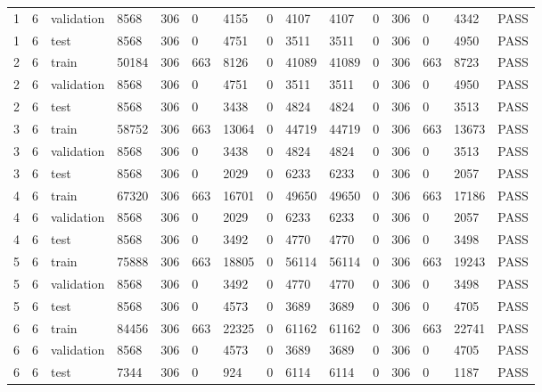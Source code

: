 \begin{longtable}{lllllllllllllll}
1 & 6 & validation & 8568 & 306 & 0 & 4155 & 0 & 4107 & 4107 & 0 & 306 & 0 & 4342 & PASS \\
1 & 6 & test & 8568 & 306 & 0 & 4751 & 0 & 3511 & 3511 & 0 & 306 & 0 & 4950 & PASS \\
2 & 6 & train & 50184 & 306 & 663 & 8126 & 0 & 41089 & 41089 & 0 & 306 & 663 & 8723 & PASS \\
2 & 6 & validation & 8568 & 306 & 0 & 4751 & 0 & 3511 & 3511 & 0 & 306 & 0 & 4950 & PASS \\
2 & 6 & test & 8568 & 306 & 0 & 3438 & 0 & 4824 & 4824 & 0 & 306 & 0 & 3513 & PASS \\
3 & 6 & train & 58752 & 306 & 663 & 13064 & 0 & 44719 & 44719 & 0 & 306 & 663 & 13673 & PASS \\
3 & 6 & validation & 8568 & 306 & 0 & 3438 & 0 & 4824 & 4824 & 0 & 306 & 0 & 3513 & PASS \\
3 & 6 & test & 8568 & 306 & 0 & 2029 & 0 & 6233 & 6233 & 0 & 306 & 0 & 2057 & PASS \\
4 & 6 & train & 67320 & 306 & 663 & 16701 & 0 & 49650 & 49650 & 0 & 306 & 663 & 17186 & PASS \\
4 & 6 & validation & 8568 & 306 & 0 & 2029 & 0 & 6233 & 6233 & 0 & 306 & 0 & 2057 & PASS \\
4 & 6 & test & 8568 & 306 & 0 & 3492 & 0 & 4770 & 4770 & 0 & 306 & 0 & 3498 & PASS \\
5 & 6 & train & 75888 & 306 & 663 & 18805 & 0 & 56114 & 56114 & 0 & 306 & 663 & 19243 & PASS \\
5 & 6 & validation & 8568 & 306 & 0 & 3492 & 0 & 4770 & 4770 & 0 & 306 & 0 & 3498 & PASS \\
5 & 6 & test & 8568 & 306 & 0 & 4573 & 0 & 3689 & 3689 & 0 & 306 & 0 & 4705 & PASS \\
6 & 6 & train & 84456 & 306 & 663 & 22325 & 0 & 61162 & 61162 & 0 & 306 & 663 & 22741 & PASS \\
6 & 6 & validation & 8568 & 306 & 0 & 4573 & 0 & 3689 & 3689 & 0 & 306 & 0 & 4705 & PASS \\
6 & 6 & test & 7344 & 306 & 0 & 924 & 0 & 6114 & 6114 & 0 & 306 & 0 & 1187 & PASS \\
\end{longtable}
